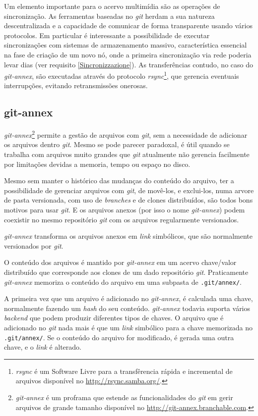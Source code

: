 Um elemento importante para o acervo multimídia são as operações de
sincronização. As ferramentas baseadas no \emph{git} herdam a sua
natureza descentralizada e a capacidade de comunicar de forma
transparente usando vários protocolos. Em particular é interessante a
possibilidade de executar sincronizações com sistemas de armazenamento
massivo, característica essencial na fase de criação de um novo nó,
onde a primeira sincronização via rede poderia levar dias (ver
requisito \ref{Sincronizzazione}). As transferências contudo, no caso
do \emph{git-annex}, são executadas através do protocolo
\emph{rsync}\footnote{\emph{rsync} é um Software Livre para a
  transfêrencia rápida e incremental de arquivos disponível no
  \url{http://rsync.samba.org/}.}, que gerencia eventuais
interrupções, evitando retransmissões onerosas. 

\subsection{git-annex}\label{git-annex}
\emph{git-annex}\footnote{\emph{git-annex} é um proframa que estende
  as funcionalidades do \emph{git} em gerir arquivos de grande tamanho
disponível no \url{http://git-annex.branchable.com}.} permite a
gestão de arquivos com \emph{git}, sem a necessidade de adicionar os
arquivos dentro \emph{git}. Mesmo se pode parecer paradoxal, é útil
quando se trabalha com arquivos muito grandes que \emph{git}
atualmente não gerencia facilmente por limitações devidas a memoria,
tempo ou espaço no disco.

Mesmo sem manter o histórico das mudanças do conteúdo do arquivo, ter
a possibilidade de gerenciar arquivos com \emph{git}, de movê-los, e
exclui-los, numa arvore de pasta versionada, com uso de
\emph{branches} e de clones distribuídos, são todos bons motivos para
usar \emph{git}. E os arquivos anexos (por isso o nome
\emph{git-annex}) podem coexistir no mesmo repositório \emph{git} com
os arquivos regularmente versionados. 

\emph{git-annex} transforma os arquivos anexos em \emph{link}
simbólicos, que são normalmente versionados por \emph{git}. 

O conteúdo dos arquivos é mantido por \emph{git-annex} em um acervo
chave/valor distribuído que corresponde aos clones de um dado
repositório \emph{git}. Praticamente \emph{git-annex} memoriza o
conteúdo do arquivo em uma subpasta de \verb|.git/annex/|.

A primeira vez que um arquivo é adicionado no \emph{git-annex}, é
calculada uma chave, normalmente fazendo um \emph{hash} do seu
conteúdo. \emph{git-annex} todavia suporta vários \emph{backend} que
podem produzir diferentes tipos de chaves. O arquivo que é adicionado
no \emph{git} nada mais é que um \emph{link} simbólico para a chave
memorizada no \verb|.git/annex/|. Se o conteúdo do arquivo for
modificado, é gerada uma outra chave, e o \emph{link} é alterado. 

